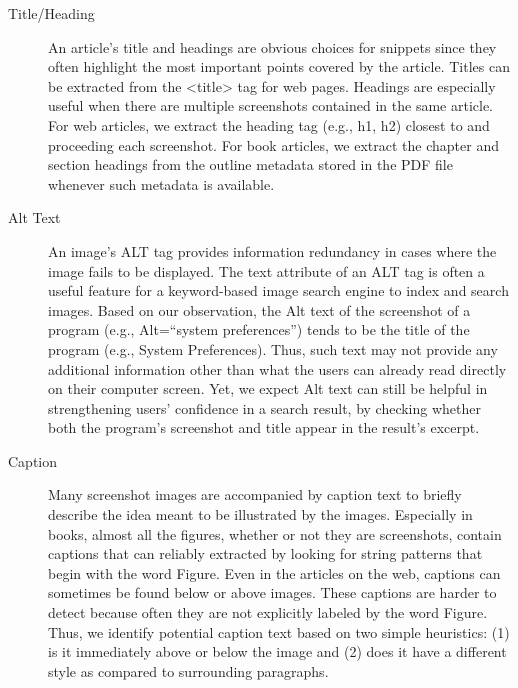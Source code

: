 \documentclass{www2010-submission}
\begin{document}
\begin{description}

\item[Title/Heading] An article's title and headings are 
  obvious choices for snippets since they often highlight the most
  important points covered by the article. Titles can be extracted
  from the <title> tag for web pages. Headings are especially useful
  when there are multiple screenshots contained in the same
  article. For web articles, we extract the heading tag (e.g., h1, h2)
  closest to and proceeding each screenshot. For book articles, we
  extract the chapter and section headings from the outline metadata
  stored in the PDF file whenever such metadata is available.

\item[Alt Text] An image's ALT tag provides information redundancy in
  cases where the image fails to be displayed. The text attribute of an
  ALT tag is often a useful feature for a keyword-based image search
  engine to index and search images. Based on our observation, the Alt
  text of the screenshot of a program (e.g., Alt=``system preferences'') tends
  to be the title of the program (e.g., System Preferences).
  Thus, such text may not provide any additional information other
  than what the users can already read directly on their computer
  screen. Yet, we expect Alt text can still be helpful in
  strengthening users' confidence in a search result, by checking
  whether both the program's screenshot and title appear in the
  result's excerpt.

\item[Caption] Many screenshot images are accompanied by caption text
  to briefly describe the idea meant to be illustrated by the images.
  Especially in books, almost all the figures, whether or not they are
  screenshots, contain captions that can reliably extracted by looking
  for string patterns that begin with the word Figure.  Even in the
  articles on the web, captions can sometimes be found below or above
  images. These captions are harder to detect because often they are
  not explicitly labeled by the word Figure. Thus, we identify
  potential caption text based on two simple heuristics: (1) is it
  immediately above or below the image and (2) does it have a
  different style as compared to surrounding paragraphs.


\end{description}
\end{document}
